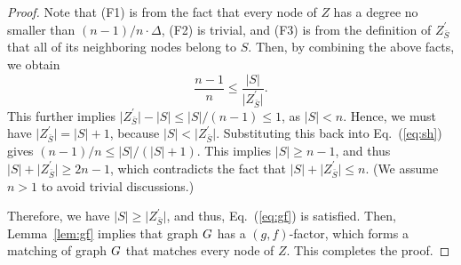 \documentclass[10pt,journal,compsoc]{IEEEtran}
\begin{document}
\begin{proof}
\noindent Note that (F1) is from the fact that every node of $Z$ has a degree no smaller than 
$(n-1)/n \cdot \Delta$, (F2) is trivial, and (F3) is from the definition of $Z_{\bar{S}}^{\prime}$ 
that all of its neighboring nodes belong to $S$. Then, by combining the above facts, we obtain
\begin{equation}
\label{eq:sh}
\frac{n-1}{n} \le \frac{\lvert S \rvert}{\lvert  Z_{\bar{S}}^{\prime} \rvert}.
\end{equation}
This further implies $\lvert  Z_{\bar{S}}^{\prime} \rvert - \lvert S \rvert \le \lvert S \rvert/(n-1) \le 1$,
as $\lvert S \rvert < n$. Hence, we must have $\lvert  Z_{\bar{S}}^{\prime} \rvert = \lvert S \rvert + 1$,
because $\lvert S \rvert < \lvert Z_{\bar{S}}^{\prime} \rvert$. Substituting this back into Eq.~(\ref{eq:sh})
gives $(n-1)/n \le \lvert S \rvert / (\lvert S \rvert + 1)$. This implies $\lvert S \rvert \ge n-1$,
and thus $\lvert S \rvert  + \lvert Z_{\bar{S}}^{\prime} \rvert \ge 2n-1$, which contradicts the fact that 
$\lvert S \rvert  + \lvert Z_{\bar{S}}^{\prime} \rvert \le n$. (We assume $n>1$ to avoid trivial discussions.)

Therefore, we have $\lvert S \rvert \ge \lvert Z_{\bar{S}}^{\prime} \rvert$, and thus, Eq.~(\ref{eq:gf})
is satisfied. Then, Lemma~\ref{lem:gf} implies that graph $G$ has a $(g,f)$-factor, which forms 
a matching of graph $G$ that matches every node of $Z$. This completes the proof.
\end{proof}
\end{document}
